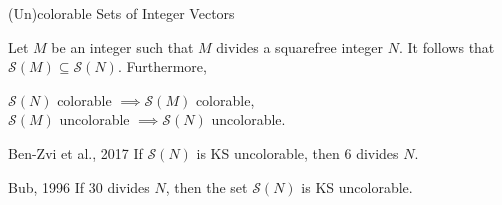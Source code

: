\documentclass[11pt]{beamer}
\begin{document}
\begin{frame}{(Un)colorable Sets of Integer Vectors}

Let $M$ be an integer such that $M$ divides a squarefree integer $N$. It follows that $\mathcal{S} (M) \subseteq \mathcal{S} (N)$. Furthermore,
\begin{center}
	$\mathcal{S} (N)$ colorable $\implies \mathcal{S} (M)$ colorable, \\
	$\mathcal{S} (M)$ uncolorable $\implies \mathcal{S} (N)$ uncolorable.
\end{center}

\begin{block}{Ben-Zvi et al., 2017}
	If $\mathcal{S} (N)$ is KS uncolorable, then $6$ divides $N$.
\end{block}

\begin{block}{Bub, 1996}
	If $30$ divides $N$, then the set $\mathcal{S} (N)$ is KS uncolorable.
\end{block}

\end{frame}

\end{document}
